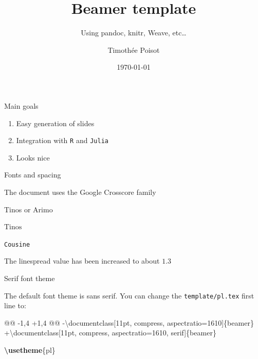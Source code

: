\documentclass[12pt, compress, aspectratio=1610]{beamer}
\title{Beamer template}
\subtitle{Using pandoc, knitr, Weave, etc\ldots{}}
\date{\today}
\author{Timothée Poisot}
\institute{Université de Montréal}
\newenvironment{Shaded}{\begin{mdframed}}{\end{mdframed}}
\newcommand{\FunctionTok}[1]{\textcolor[HTML]{26A69A}{\textbf{{#1}}}}
\newcommand{\BuiltInTok}[1]{\textcolor[HTML]{42A5F5}{{#1}}}
\newcommand{\ExtensionTok}[1]{\textcolor[rgb]{0.74,0.68,0.62}{{#1}}}
\newcommand{\NormalTok}[1]{\textcolor[HTML]{212121}{{#1}}}
\providecommand{\tightlist}{%
  \setlength{\itemsep}{0pt}\setlength{\parskip}{0pt}}
\let\OldTexttt\texttt
\renewcommand{\texttt}[1]{\OldTexttt{\color{codecolor}#1}}
\begin{document}
\maketitle

\begin{frame}[fragile]{Main goals}

\begin{enumerate}
\def\labelenumi{\arabic{enumi}.}
\tightlist
\item
  Easy generation of slides
\item
  Integration with \texttt{R} and \texttt{Julia}
\item
  Looks nice
\end{enumerate}

\end{frame}

\begin{frame}[fragile]{Fonts and spacing}

The document uses the \alert{Google Crosscore} family

\begin{description}
\tightlist
\item[Main body]
Tinos or Arimo
\item[Maths]
\(\text{Tinos}\)
\item[Code]
\texttt{Cousine}
\end{description}

The linespread value has been increased to about \(1.3\)

\end{frame}

\begin{frame}[fragile]{Serif font theme}

The default font theme is sans serif. You can change the
\texttt{template/pl.tex} first line to:

\begin{Shaded}
\begin{Highlighting}[]
\NormalTok{@@ -1,4 +1,4 @@}
\NormalTok{-}\BuiltInTok{\textbackslash{}documentclass}\NormalTok{[11pt, compress, aspectratio=1610]\{}\ExtensionTok{beamer}\NormalTok{\}}
\NormalTok{+}\BuiltInTok{\textbackslash{}documentclass}\NormalTok{[11pt, compress, aspectratio=1610, serif]\{}\ExtensionTok{beamer}\NormalTok{\}}

\FunctionTok{\textbackslash{}usetheme}\NormalTok{\{pl\}}
\end{Highlighting}
\end{Shaded}

\end{frame}
\end{document}

